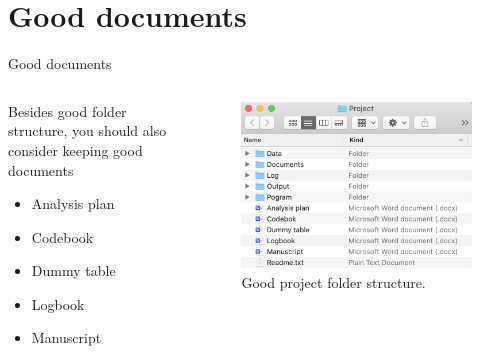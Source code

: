 \documentclass{beamer}
\begin{document}
\section{Good documents}
	\begin{frame}{Good documents}
	\begin{columns}
	\begin{column}{0.5\textwidth}
	Besides good folder structure, you should also consider keeping good documents
		\begin{itemize}
				\item Analysis plan
				\item Codebook\footnotemark
				\item Dummy table
				\item Logbook\footnotemark[\value{footnote}]
				\item Manuscript
		\end{itemize}
	
	\end{column}
	
	\begin{column}{0.5\textwidth}
	\begin{figure}
			\includegraphics[scale=0.4]{image/structure}
			\caption{Good project folder structure.}
	\end{figure}
	\end{column}
	\end{columns}
\end{frame}

\end{document}
